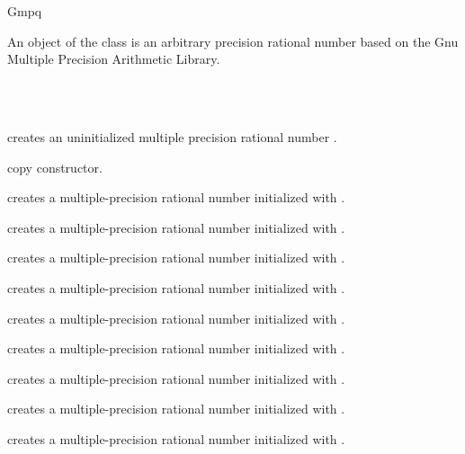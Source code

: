 \begin{ccRefClass} {Gmpq}
\label{Gmpq}

\ccDefinition

An object of the class  is an arbitrary precision rational
number based on the {\sc Gnu} Multiple Precision Arithmetic Library. 


\ccIsModel
{}\\
\\

\ccTypes


\ccCreation
{}

             {creates an uninitialized multiple precision rational number \ccVar.}

\ccHidden {}
            {copy constructor.}

            {creates a multiple-precision rational number initialized with
             .}

            {creates a multiple-precision rational number initialized with
             .}

            {creates a multiple-precision rational number initialized with
             .}

            {creates a multiple-precision rational number initialized with
             .}

            {creates a multiple-precision rational number initialized with
             .}

            {creates a multiple-precision rational number initialized with
             .}

            {creates a multiple-precision rational number initialized with
             .}

            {creates a multiple-precision rational number initialized with
             .}

            {creates a multiple-precision rational number initialized with
             .}


\end{ccRefClass}
